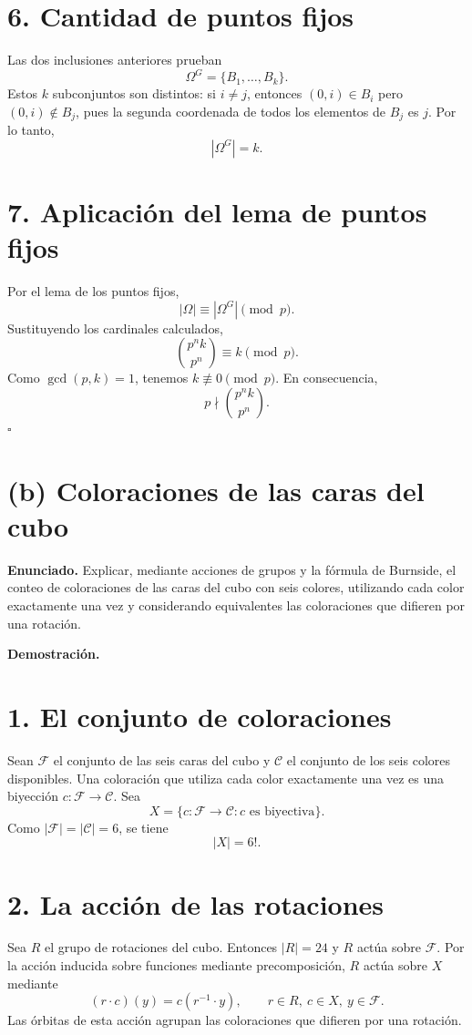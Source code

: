 \documentclass[11pt,a4paper]{article}
\begin{document}
\section*{6. Cantidad de puntos fijos}
Las dos inclusiones anteriores prueban
\[
\Omega^G=\{B_1,\ldots,B_k\}.
\]
Estos $k$ subconjuntos son distintos: si $i\neq j$, entonces $(0,i)\in B_i$ pero $(0,i)\notin B_j$, pues la segunda coordenada de todos los elementos de $B_j$ es $j$. Por lo tanto,
\[
\boxed{|\Omega^G|=k}.
\]

\section*{7. Aplicación del lema de puntos fijos}
Por el lema de los puntos fijos,
\[
|\Omega|\equiv|\Omega^G|\pmod p.
\]
Sustituyendo los cardinales calculados,
\[
\binom{p^nk}{p^n}\equiv k\pmod p.
\]
Como $\gcd(p,k)=1$, tenemos $k\not\equiv0\pmod p$. En consecuencia,
\[
\boxed{p\nmid\binom{p^nk}{p^n}}.
\]
\hfill$\square$
\newpage
\section*{(b) Coloraciones de las caras del cubo}
\textbf{Enunciado.} Explicar, mediante acciones de grupos y la fórmula de Burnside, el conteo de coloraciones de las caras del cubo con seis colores, utilizando cada color exactamente una vez y considerando equivalentes las coloraciones que difieren por una rotación.

\textbf{Demostración.}
\section*{1. El conjunto de coloraciones}
Sean $\mathcal F$ el conjunto de las seis caras del cubo y $\mathcal C$ el conjunto de los seis colores disponibles. Una coloración que utiliza cada color exactamente una vez es una biyección $c:\mathcal F\to\mathcal C$. Sea
\[
X=\{c:\mathcal F\to\mathcal C:c\text{ es biyectiva}\}.
\]
Como $|\mathcal F|=|\mathcal C|=6$, se tiene
\[
|X|=6!.
\]

\section*{2. La acción de las rotaciones}
Sea $R$ el grupo de rotaciones del cubo. Entonces $|R|=24$ y $R$ actúa sobre $\mathcal F$. Por la acción inducida sobre funciones mediante precomposición, $R$ actúa sobre $X$ mediante
\[
(r\cdot c)(y)=c(r^{-1}\cdot y),
\qquad r\in R,\ c\in X,\ y\in\mathcal F.
\]
Las órbitas de esta acción agrupan las coloraciones que difieren por una rotación.
\end{document}
